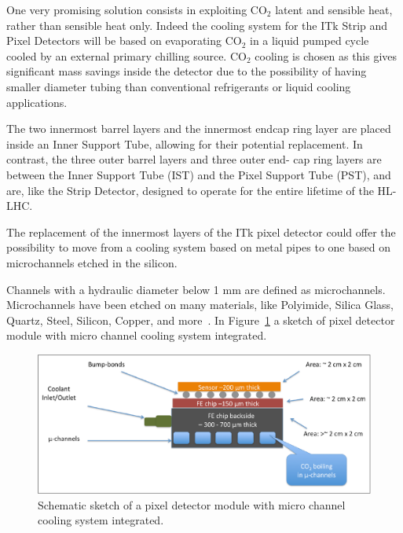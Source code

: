 One very promising solution consists in exploiting CO$_2$ latent and sensible heat, rather than sensible 
heat only. 
Indeed the cooling system for the ITk Strip and Pixel Detectors will be based on evaporating CO$_2$ in a 
liquid 
pumped cycle cooled by an external primary chilling source.  CO$_2$ cooling is chosen as this gives 
significant mass savings inside the detector due to the possibility of having smaller diameter tubing than 
conventional refrigerants or liquid cooling applications.


The two innermost barrel layers and the innermost endcap ring layer are placed inside an Inner Support 
Tube, allowing for their potential replacement. In contrast, the three outer barrel layers and three outer end-
cap ring layers are between the Inner Support Tube (IST) and the Pixel Support Tube (PST), and are, like 
the Strip Detector, designed to operate for the entire lifetime of the HL-LHC.

The replacement of the innermost layers of the ITk pixel detector could offer the possibility to move from 
a cooling system based on metal pipes to one based on microchannels etched in the silicon.

Channels with a hydraulic diameter below 1 mm are defined as microchannels. Microchannels have been etched on many materials, like Polyimide, Silica Glass, Quartz, Steel, Silicon, Copper, 
and more~\cite{KOSAR2010635}.
In Figure~\ref{fig:uChannels} a sketch of pixel detector module with micro channel cooling system integrated.
\begin{figure}[!htpb]
\centering
\includegraphics[width=1.0\textwidth]{uChannels.pdf}
\caption{\label{fig:uChannels}Schematic sketch of a pixel detector module with micro channel cooling system integrated.}
\end{figure}

